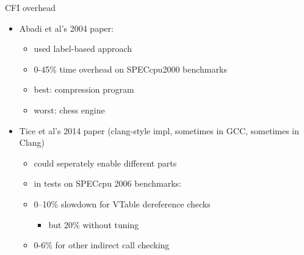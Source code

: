 \begin{frame}{CFI overhead}
\begin{itemize}
\item Abadi et al's 2004 paper:
    \begin{itemize}
    \item used label-based approach
    \item 0-45\% time overhead on SPECcpu2000 benchmarks
    \item best: compression program
    \item worst: chess engine
    \end{itemize}
\item Tice et al's 2014 paper (clang-style impl, sometimes in GCC, sometimes in Clang)
    \begin{itemize}
    \item could seperately enable different parts
    \item in tests on SPECcpu 2006 benchmarks:
    \item 0--10\% slowdown for VTable dereference checks 
        \begin{itemize}
        \item but 20\% without tuning
        \end{itemize}
    \item 0-6\% for other indirect call checking
    \end{itemize}
\end{itemize}
\end{frame}
